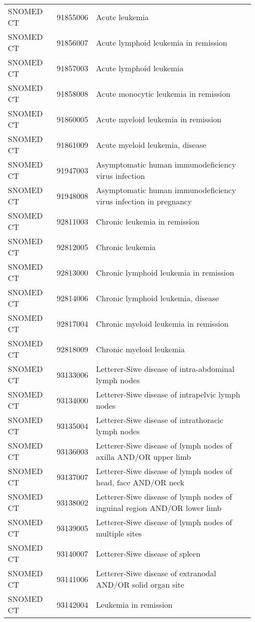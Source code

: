 \begin{longtable}{p{}p{}p{}}
  SNOMED CT & 91855006 & Acute leukemia \\ 
  SNOMED CT & 91856007 & Acute lymphoid leukemia in remission \\ 
  SNOMED CT & 91857003 & Acute lymphoid leukemia \\ 
  SNOMED CT & 91858008 & Acute monocytic leukemia in remission \\ 
  SNOMED CT & 91860005 & Acute myeloid leukemia in remission \\ 
  SNOMED CT & 91861009 & Acute myeloid leukemia, disease \\ 
  SNOMED CT & 91947003 & Asymptomatic human immunodeficiency virus infection \\ 
  SNOMED CT & 91948008 & Asymptomatic human immunodeficiency virus infection in pregnancy \\ 
  SNOMED CT & 92811003 & Chronic leukemia in remission \\ 
  SNOMED CT & 92812005 & Chronic leukemia \\ 
  SNOMED CT & 92813000 & Chronic lymphoid leukemia in remission \\ 
  SNOMED CT & 92814006 & Chronic lymphoid leukemia, disease \\ 
  SNOMED CT & 92817004 & Chronic myeloid leukemia in remission \\ 
  SNOMED CT & 92818009 & Chronic myeloid leukemia \\ 
  SNOMED CT & 93133006 & Letterer-Siwe disease of intra-abdominal lymph nodes \\ 
  SNOMED CT & 93134000 & Letterer-Siwe disease of intrapelvic lymph nodes \\ 
  SNOMED CT & 93135004 & Letterer-Siwe disease of intrathoracic lymph nodes \\ 
  SNOMED CT & 93136003 & Letterer-Siwe disease of lymph nodes of axilla AND/OR upper limb \\ 
  SNOMED CT & 93137007 & Letterer-Siwe disease of lymph nodes of head, face AND/OR neck \\ 
  SNOMED CT & 93138002 & Letterer-Siwe disease of lymph nodes of inguinal region AND/OR lower limb \\ 
  SNOMED CT & 93139005 & Letterer-Siwe disease of lymph nodes of multiple sites \\ 
  SNOMED CT & 93140007 & Letterer-Siwe disease of spleen \\ 
  SNOMED CT & 93141006 & Letterer-Siwe disease of extranodal AND/OR solid organ site \\ 
  SNOMED CT & 93142004 & Leukemia in remission \\ 

\end{longtable}
